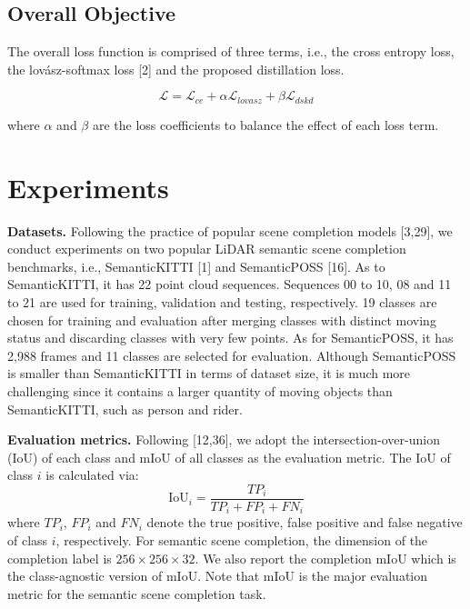 \documentclass[10pt,twocolumn,letterpaper]{article}
\begin{document}
\subsection{Overall Objective}

The overall loss function is comprised of three terms, i.e., the cross entropy loss, the lovász-softmax loss [2] and the proposed distillation loss.

\begin{equation}
  \mathcal{L} = \mathcal{L}_{ce} + \alpha \mathcal{L}_{lovasz} + \beta \mathcal{L}_{dskd}
  \label{eq:total_loss}
\end{equation}

where $\alpha$ and $\beta$ are the loss coefficients to balance the effect of each loss term.


\section{Experiments}

\textbf{Datasets.}
Following the practice of popular scene completion models [3,29], we conduct experiments on two popular LiDAR semantic scene completion benchmarks, i.e., SemanticKITTI [1] and SemanticPOSS [16]. As to SemanticKITTI, it has 22 point cloud sequences. Sequences 00 to 10, 08 and 11 to 21 are used for training, validation and testing, respectively. 19 classes are chosen for training and evaluation after merging classes with distinct moving status and discarding classes with very few points. As for SemanticPOSS, it has 2,988 frames and 11 classes are selected for evaluation. Although SemanticPOSS is smaller than SemanticKITTI in terms of dataset size, it is much more challenging since it contains a larger quantity of moving objects than SemanticKITTI, such as person and rider.

\textbf{Evaluation metrics.}
Following [12,36], we adopt the intersection-over-union (IoU) of each class and mIoU of all classes as the evaluation metric. The IoU of class $i$ is calculated via:
\[
  \text{IoU}_i = \frac{TP_i}{TP_i + FP_i + FN_i}
\]
where $TP_i$, $FP_i$ and $FN_i$ denote the true positive, false positive and false negative of class $i$, respectively. For semantic scene completion, the dimension of the completion label is $256\times256\times32$. We also report the completion mIoU which is the class-agnostic version of mIoU. Note that mIoU is the major evaluation metric for the semantic scene completion task.
\end{document}
